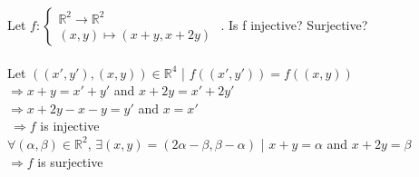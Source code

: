 \documentclass{article}
\begin{document}
\noindent Let
$f: \begin{cases}
\mathbb{R}^2 \rightarrow \mathbb{R}^2 \\
(x,y) \mapsto (x + y, x + 2y)
\end{cases}
$
. Is f injective? Surjective?\\\\

\noindent Let $ ((x', y') , (x, y)) \in \mathbb{R}^4$ |
$ f((x', y')) = f((x, y)) $\\
$ \Rightarrow x + y = x' + y' $ and $ x + 2y = x' + 2y' $\\
$ \Rightarrow x + 2y - x - y = y' $ and $  x = x' $\\
$\ \Rightarrow f$ is injective\\


\noindent $\forall (\alpha, \beta) \in \mathbb{R}^2$, $\exists
(x, y ) = (2\alpha - \beta , \beta - \alpha) $ | $ x + y = \alpha $ and
$ x + 2y = \beta $ \\
$\Rightarrow f $ is surjective\\
\end{document}
